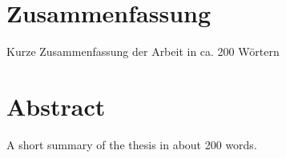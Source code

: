 \chapter*{Zusammenfassung}

Kurze Zusammenfassung der Arbeit in ca. 200 Wörtern

\clearpage

\chapter*{Abstract}

A short summary of the thesis in about 200 words.


\clearpage
